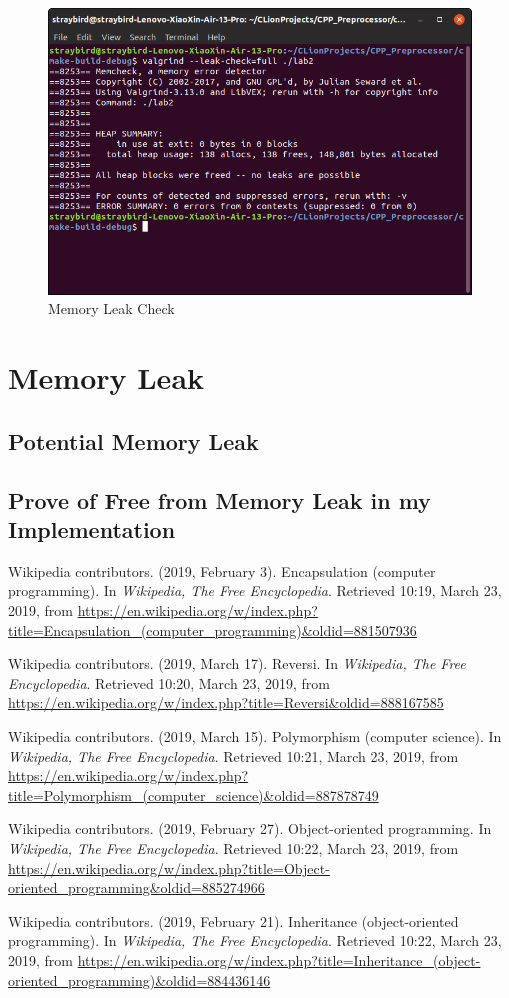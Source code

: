 \documentclass[a4paper]{report}
\begin{document}
\begin{figure}
  \centering
  \includegraphics[width=12cm]{mem.png}
  \caption{Memory Leak Check}\label{2}
\end{figure}

\chapter{Memory Leak}
\section{Potential Memory Leak}
\section{Prove of Free from Memory Leak in my Implementation}

\begin{thebibliography}{A}

Wikipedia contributors. (2019, February 3). Encapsulation (computer programming). In \emph{Wikipedia, The Free Encyclopedia}. Retrieved 10:19, March 23, 2019, from \url{https://en.wikipedia.org/w/index.php?title=Encapsulation_(computer_programming)&oldid=881507936}

Wikipedia contributors. (2019, March 17). Reversi. In \emph{Wikipedia, The Free Encyclopedia}. Retrieved 10:20, March 23, 2019, from \url{https://en.wikipedia.org/w/index.php?title=Reversi&oldid=888167585}

Wikipedia contributors. (2019, March 15). Polymorphism (computer science). In \emph{Wikipedia, The Free Encyclopedia}. Retrieved 10:21, March 23, 2019, from \url{https://en.wikipedia.org/w/index.php?title=Polymorphism_(computer_science)&oldid=887878749}

Wikipedia contributors. (2019, February 27). Object-oriented programming. In \emph{Wikipedia, The Free Encyclopedia}. Retrieved 10:22, March 23, 2019, from \url{https://en.wikipedia.org/w/index.php?title=Object-oriented_programming&oldid=885274966}

Wikipedia contributors. (2019, February 21). Inheritance (object-oriented programming). In \emph{Wikipedia, The Free Encyclopedia}. Retrieved 10:22, March 23, 2019, from \url{https://en.wikipedia.org/w/index.php?title=Inheritance_(object-oriented_programming)&oldid=884436146}

\end{thebibliography}
\end{document}
